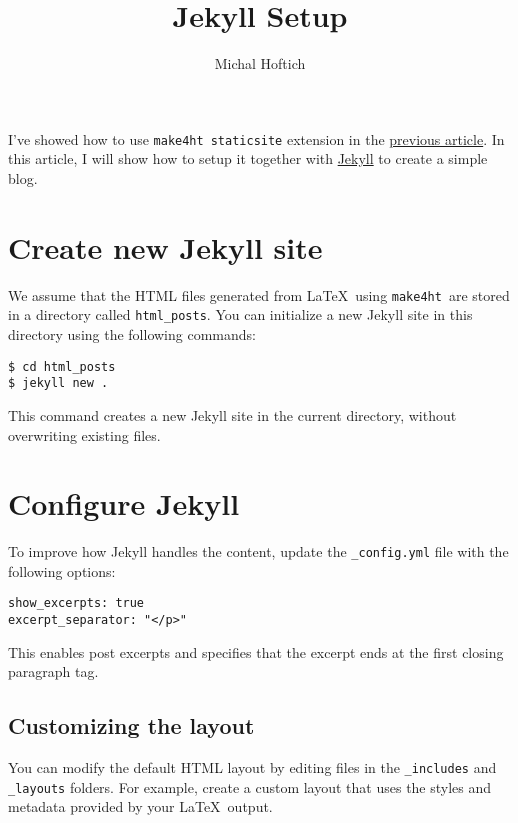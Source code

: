 \documentclass{article}
\title{Jekyll Setup}
\author{Michal Hoftich}
\def\makeht{\texttt{make4ht}}
\begin{document}
\maketitle

I've showed how to use \makeht\ \texttt{staticsite} extension
in the \href{/testblog/2021/07/30/how-to-blog-with-tex4ht.html}
{previous article}. In this article, I will show how to 
setup it together with \href{https://jekyllrb.com/}{Jekyll}
to create a simple blog.

\tableofcontents

\section{Create new Jekyll site}

We assume that the HTML files generated from \LaTeX\ using \makeht\ 
are stored in a directory called \texttt{html\_posts}. 
You can initialize a new Jekyll site in this directory using the following commands:

\begin{verbatim}
$ cd html_posts
$ jekyll new .
\end{verbatim}

This command creates a new Jekyll site in the current directory, without overwriting existing files.

\section{Configure Jekyll}

To improve how Jekyll handles the content, update the \texttt{\_config.yml} file 
with the following options:

\begin{verbatim}
show_excerpts: true
excerpt_separator: "</p>"
\end{verbatim}

This enables post excerpts and specifies that the excerpt ends at the first closing paragraph tag.

\subsection{Customizing the layout}

You can modify the default HTML layout by editing files in the \texttt{\_includes} and \texttt{\_layouts} folders. 
For example, create a custom layout that uses the styles and metadata provided by your \LaTeX\ output.
\end{document}
